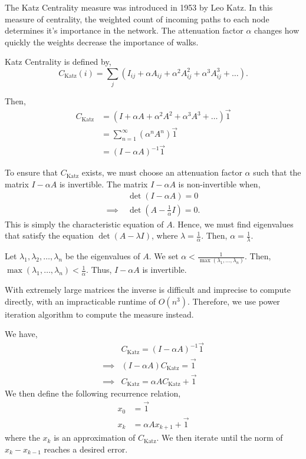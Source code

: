 \documentclass{article}
\begin{document}
The Katz Centrality measure was introduced in 1953 by Leo Katz.
\autocite{katz1953}
In this measure of centrality, the weighted count of incoming paths to each node determines it's importance in the network. The attenuation factor $\alpha$ changes how quickly the weights decrease the importance of walks.

Katz Centrality is defined by,
\begin{equation*}
    C_{\textrm{Katz}}(i) = \sum_{j} (I_{ij} + \alpha A_{ij} + \alpha^2 A_{ij}^2 + \alpha^3 A_{ij}^3 + \dots).
\end{equation*}
\autocite{katz2011}

Then,
\begin{align*}
    C_{\textrm{Katz}} &= (I + \alpha A + \alpha^2 A^2 + \alpha^3 A^3 + \dots) \overrightarrow{1}\\
    &= \sum^\infty_{n=1} (\alpha^n A^n)\overrightarrow{1} \\ 
&= (I - \alpha A)^{-1} \overrightarrow{1} 
\end{align*}

To ensure that $C_{\textrm{Katz}}$ exists, we must choose an attenuation factor $\alpha$ such that the matrix $I - \alpha A$ is invertible. The matrix $I - \alpha A$ is non-invertible when,
\begin{align*}
    & \det (I - \alpha A) = 0 \\
    \implies \; & \det (A - \frac{1}{\alpha} I) = 0.
\end{align*}
This is simply the characteristic equation of $A$. Hence, we must find eigenvalues that satisfy the equation $\det(A - \lambda I)$, where $\lambda = \frac{1}{\alpha}$. Then, $\alpha = \frac{1}{\lambda}$.

Let $\lambda_1, \lambda_2, \dots, \lambda_n$ be the eigenvalues of $A$. We set $\alpha < \frac{1}{\max(\lambda_1, \dots, \lambda_n)}$.
Then, $\max(\lambda_1, \dots, \lambda_n) < \frac{1}{\alpha}$. Thus, $I - \alpha A$ is invertible.



With extremely large matrices the inverse is difficult and imprecise to compute directly, with an impracticable runtime of $O(n^3)$.
Therefore, we use power iteration algorithm to compute the measure instead.

We have,
\begin{align*}
    & C_{\textrm{Katz}} = (I - \alpha A)^{-1} \overrightarrow{1} \\
    \implies & (I - \alpha A) C_{\textrm{Katz}} = \overrightarrow{1} \\
    \implies & C_{\textrm{Katz}} = \alpha A C_{\textrm{Katz}} + \overrightarrow{1}
\end{align*}
We then define the following recurrence relation,
\begin{align*}
    x_0 & = \overrightarrow{1} \\
    x_k & = \alpha A x_{k+1} + \overrightarrow{1}
\end{align*} where the $x_k$ is an approximation of $C_{\textrm{Katz}}$. We then iterate until the norm of $x_{k} - x_{k-1}$ reaches a desired error.
\end{document}
